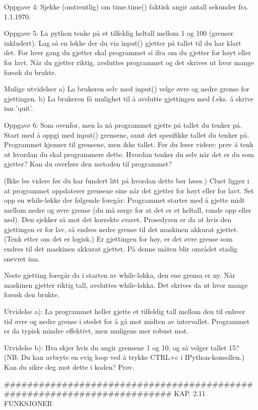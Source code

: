 {Oppgave 4:
Sjekke (omtrentlig) om time.time() faktisk angir antall sekunder fra. 1.1.1970. 


Oppgave 5:
La python tenke på et tilfeldig heltall mellom 1 og 100 (grenser inkludert). 
Lag så en løkke der du via input() gjetter på tallet til du har klart det. 
For hver gang du gjetter skal programmet si ifra om du gjetter for høyt eller for lavt.
Når du gjetter riktig, avsluttes programmet og det skrives ut hvor mange forsøk du brukte. 

Mulige utvidelser
a) La brukeren selv med input() velge øvre og nedre grense for gjettingen.
b) La brukeren få mulighet til å avslutte gjettingen med f.eks. å skrive inn 'quit'.


Oppgave 6: Som ovenfor, men la nå programmet gjette på tallet du tenker på.
Start med å oppgi med input() grensene, samt det spesifikke tallet du tenker på.
Programmet kjenner til grensene, men ikke tallet.
Før du leser videre: prøv å tenk ut hvordan du skal programmere dette.
Hvordan tenker du selv når det er du som gjetter?
Kan du overføre den metoden til programmet?

(Ikke les videre før du har fundert litt på hvordan dette bør løses.) 
Cluet ligger i at programmet oppdaterer grensene sine når det gjetter for høyt
eller for lavt. 
Set opp en while-løkke der følgende foregår: 
Programmet starter med å gjette midt mellom nedre og øvre grense
(du må sørge for at det er et heltall, runde opp eller ned).
Den sjekker så mot det korrekte svaret. 
Prosedyren er da at hvis den gjettingen er for lav,
så endres nedre grense til det maskinen akkurat gjettet.
(Tenk etter om det er logisk.) 
Er gjettingen for høy, er det øvre grense som endres til det maskinen akkurat gjettet.
På denne måten blir området stadig snevret inn.

Neste gjetting foregår da i starten av while-løkka, den ene grensa er ny. 
Når maskinen gjetter riktig tall, avsluttes while-løkka.
Det skrives da ut hvor mange forsøk den brukte. 

Utvidelse a): La programmet heller gjette et tilfeldig tall mellom den til enhver tid
øvre og nedre grense i stedet for å gå mot midten av intervallet.
Programmet er da typisk mindre effektivt, men muligens mer robust mot.

Utvidelse b): Hva skjer hvis du angir grensene 1 og 10, og så velger tallet 15?
(NB: Du kan avbryte en evig loop ved å trykke CTRL+c i IPython-konsollen.) 
Kan du sikre deg mot dette i koden? Prøv. 

######################################################################## 
KAP. 2.11  FUNKSJONER

}
